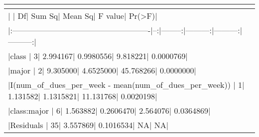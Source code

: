 \begin{table}[!tbp]
\begin{center}
\begin{tabular}{l}
\hline\hline
\multicolumn{1}{c}{}\tabularnewline
\hline
|                                                     | Df|   Sum Sq|   Mean Sq|   F value|    Pr(\textgreater F)|\tabularnewline
|:----------------------------------------------------|--:|--------:|---------:|---------:|---------:|\tabularnewline
|class                                                |  3| 2.994167| 0.9980556|  9.818221| 0.0000769|\tabularnewline
|major                                                |  2| 9.305000| 4.6525000| 45.768266| 0.0000000|\tabularnewline
|I(num_of_dues_per_week - mean(num_of_dues_per_week)) |  1| 1.131582| 1.1315821| 11.131768| 0.0020198|\tabularnewline
|class:major                                          |  6| 1.563882| 0.2606470|  2.564076| 0.0364869|\tabularnewline
|Residuals                                            | 35| 3.557869| 0.1016534|        NA|        NA|\tabularnewline
\hline
\end{tabular}\end{center}
\end{table}
